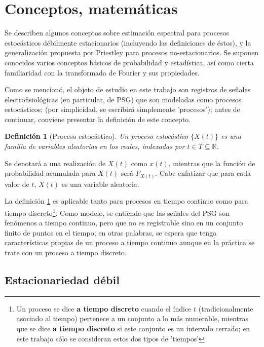 \documentclass[12pt,a4paper]{mitthesis}
\newtheorem{defn}{Definici\'on}
\newcommand{\R}{\mathbb{R}}
\begin{document}
\section{Conceptos, matem\'aticas}

Se describen algunos conceptos sobre estimaci\'on espectral para procesos estoc\'asticos 
d\'ebilmente estacionarios (incluyendo las definiciones de \'estos), y la generalizaci\'on 
propuesta por Priestley para procesos no-estacionarios. 
Se suponen conocidos varios conceptos b\'asicos de probabilidad y estad\'istica, as\'i como cierta 
familiaridad con la transformada de Fourier y sus propiedades.

Como se mencion\'o, el objeto de estudio en este trabajo son registros de se\~nales
electrofisiol\'ogicas (en particular, de PSG) que son modeladas como procesos estoc\'asticos; (por 
simplicidad, se escribir\'a simplemente 'procesos'); antes de continuar, conviene presentar la 
definici\'on de este concepto. 

\begin{defn}[Proceso estoc\'astico]
Un proceso estoc\'astico $\{ X(t) \}$ es una familia de variables aleatorias en los reales, 
indexadas por $t \in T \subseteq \R$.
\label{proc_estocastico}
\end{defn}

Se denotar\'a a una realizaci\'on de $X(t)$ como $x(t)$, mientras que la funci\'on de probabilidad 
acumulada para $X(t)$ ser\'a $F_{X(t)}$. Cabe enfatizar que para cada valor de $t$, $X(t)$ es una 
variable  aleatoria.

La definici\'on \ref{proc_estocastico} es aplicable tanto para procesos en tiempo continuo como 
para tiempo discreto\footnote{Un proceso se dice \textbf{a tiempo discreto} cuando el \'indice $t$ 
(tradicionalmente asociado al tiempo) pertenece a un conjunto a lo m\'as numerable, mientras que se 
dice \textbf{a tiempo discreto} si este conjunto es un intervalo cerrado; en este trabajo s\'olo se 
consideran estos dos tipos de 'tiempos'}.
Como modelo, se entiende que las se\~nales del PSG son fen\'omenos a tiempo continuo, pero que no
es registrable sino en un conjunto finito de puntos en el tiempo; en otras palabras, se espera que 
tenga caracter\'isticas propias de un proceso a tiempo continuo aunque en la pr\'actica se trate 
con un proceso a tiempo discreto.

\subsection{Estacionariedad d\'ebil}
\end{document}
